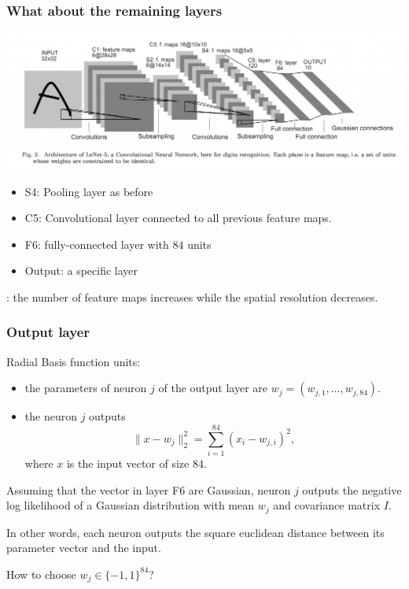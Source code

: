 \begin{frame}
	\frametitle{What about the remaining layers}
	
	\begin{center}
		\includegraphics[scale=0.3]{figs/LeNet}
	\end{center}

\pause 
\begin{itemize}
	\item S4: Pooling layer as before
	\item C5: Convolutional layer connected to all previous feature maps. 
	\item F6: fully-connected layer with $84$ units
	\item Output: a specific layer
\end{itemize}

: the number of feature maps increases while the spatial resolution decreases. 
	
\end{frame}

\begin{frame}
	\frametitle{Output layer}
	
	
	
	Radial Basis function units:
	\begin{itemize}
		\item the parameters of neuron $j$ of the output layer are $w_j = (w_{j,1}, \hdots , w_{j, 84})$.
		
		\item the neuron $j$ outputs
		$$
		\|x - w_j\|_2^2 = \sum_{i=1}^{84} (x_i - w_{j,i})^2,
		$$
		where $x$ is the input vector of size $84$. 
	\end{itemize}
	
	\bigskip
	
	Assuming that the vector in layer F6 are Gaussian, neuron $j$ outputs the negative log likelihood of a Gaussian distribution with mean $w_j$ and covariance matrix $I$.
	
	\bigskip
	
	In other words, each neuron outputs the square euclidean distance between its parameter vector and the input.
	
	\medskip  
	
	How to choose $w_j \in \{-1, 1\}^{84}$?
	 
\end{frame}


